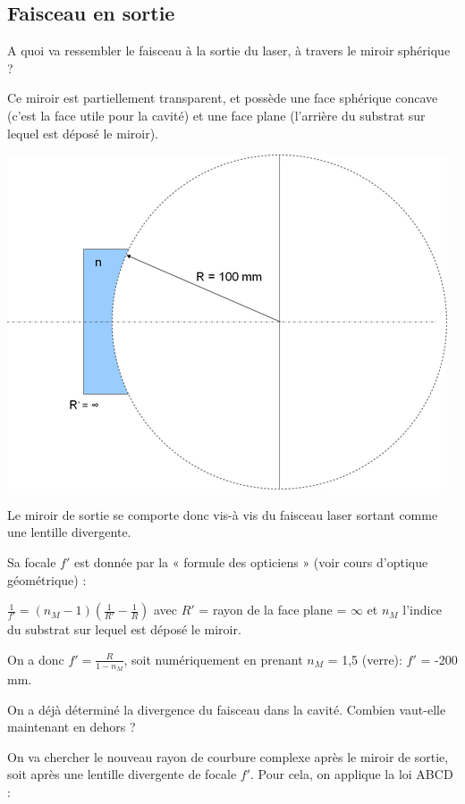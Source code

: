 \documentclass{book}
\begin{document}
\subsection{Faisceau en sortie}


A quoi va ressembler le faisceau à la sortie du laser, à travers le miroir sphérique ?

Ce miroir est partiellement transparent, et possède une face sphérique concave (c'est la face utile pour la cavité) et une face plane (l'arrière du substrat sur lequel est déposé le miroir).

{\centering
\includegraphics[scale=1.7]{images/EC_Fig6.jpg}
\par}

Le miroir de sortie se comporte donc vis-à vis du faisceau laser sortant comme une lentille divergente.

Sa focale \(f'\) est donnée par la « formule des opticiens » (voir cours d'optique géométrique) :

\(\frac 1 {f'}=(n_M-1)\left(\frac 1{R'}-\frac 1R\right)\) avec \(R'\) = rayon de la face plane = \(\infty\) et \(n_M\) l'indice du substrat sur lequel est déposé le miroir.

On a donc \(f'=\frac R {1-n_M}\), soit numériquement en prenant \(n_M\) = 1,5 (verre): \(f'\) = -200 mm.

On a déjà déterminé la divergence du faisceau dans la cavité. Combien vaut-elle maintenant en dehors ?

On va chercher le nouveau rayon de courbure complexe après le miroir de sortie, soit après une lentille divergente de focale \(f'\). Pour cela, on applique la loi ABCD :
\end{document}

